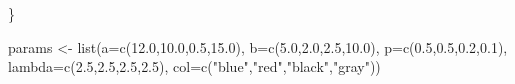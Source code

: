 \documentclass[
]{article}
\newenvironment{Shaded}{\begin{snugshade}}{\end{snugshade}}
\newcommand{\AttributeTok}[1]{\textcolor[rgb]{0.77,0.63,0.00}{#1}}
\newcommand{\FloatTok}[1]{\textcolor[rgb]{0.00,0.00,0.81}{#1}}
\newcommand{\FunctionTok}[1]{\textcolor[rgb]{0.00,0.00,0.00}{#1}}
\newcommand{\NormalTok}[1]{#1}
\newcommand{\OtherTok}[1]{\textcolor[rgb]{0.56,0.35,0.01}{#1}}
\newcommand{\StringTok}[1]{\textcolor[rgb]{0.31,0.60,0.02}{#1}}
\begin{document}
\begin{Shaded}
\begin{Highlighting}[]
\NormalTok{\}}


\NormalTok{params }\OtherTok{\textless{}{-}} \FunctionTok{list}\NormalTok{(}\AttributeTok{a=}\FunctionTok{c}\NormalTok{(}\FloatTok{12.0}\NormalTok{,}\FloatTok{10.0}\NormalTok{,}\FloatTok{0.5}\NormalTok{,}\FloatTok{15.0}\NormalTok{),}
               \AttributeTok{b=}\FunctionTok{c}\NormalTok{(}\FloatTok{5.0}\NormalTok{,}\FloatTok{2.0}\NormalTok{,}\FloatTok{2.5}\NormalTok{,}\FloatTok{10.0}\NormalTok{),}
               \AttributeTok{p=}\FunctionTok{c}\NormalTok{(}\FloatTok{0.5}\NormalTok{,}\FloatTok{0.5}\NormalTok{,}\FloatTok{0.2}\NormalTok{,}\FloatTok{0.1}\NormalTok{),}
               \AttributeTok{lambda=}\FunctionTok{c}\NormalTok{(}\FloatTok{2.5}\NormalTok{,}\FloatTok{2.5}\NormalTok{,}\FloatTok{2.5}\NormalTok{,}\FloatTok{2.5}\NormalTok{),}
               \AttributeTok{col=}\FunctionTok{c}\NormalTok{(}\StringTok{"blue"}\NormalTok{,}\StringTok{"red"}\NormalTok{,}\StringTok{"black"}\NormalTok{,}\StringTok{"gray"}\NormalTok{))}


\end{Highlighting}
\end{Shaded}
\end{document}

